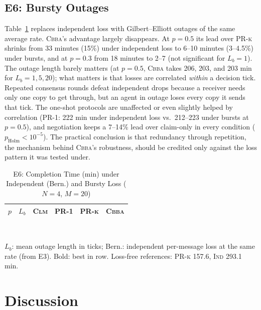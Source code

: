 \documentclass[conference]{IEEEtran}
\newcommand{\IND}{\textsc{Ind}}
\newcommand{\CLM}{\textsc{Clm}}
\newcommand{\PRone}{\textsc{PR-1}}
\newcommand{\PRk}{\textsc{PR-k}}
\newcommand{\CBBA}{\textsc{Cbba}}
\begin{document}
\subsection{E6: Bursty Outages}
Table~\ref{tab:bursty} replaces independent loss with Gilbert--Elliott outages of the same average rate. \CBBA{}'s advantage largely disappears. At $p=0.5$ its lead over \PRk{} shrinks from 33 minutes (15\%) under independent loss to 6--10 minutes (3--4.5\%) under bursts, and at $p=0.3$ from 18 minutes to 2--7 (not significant for $L_b=1$). The outage length barely matters (at $p=0.5$, \CBBA{} takes 206, 203, and 203 min for $L_b=1,5,20$); what matters is that losses are correlated \emph{within} a decision tick. Repeated consensus rounds defeat independent drops because a receiver needs only one copy to get through, but an agent in outage loses every copy it sends that tick. The one-shot protocols are unaffected or even slightly helped by correlation (\PRone{}: 222 min under independent loss vs.\ 212--223 under bursts at $p=0.5$), and negotiation keeps a 7--14\% lead over claim-only in every condition ($p_{\text{Holm}}<10^{-5}$). The practical conclusion is that redundancy through repetition, the mechanism behind \CBBA{}'s robustness, should be credited only against the loss pattern it was tested under.

\begin{table}[!t]
\caption{E6: Completion Time (min) under Independent (Bern.) and Bursty Loss ($N=4$, $M=20$)}
\label{tab:bursty}
\centering
\footnotesize
\setlength{\tabcolsep}{4pt}
\begin{tabular}{@{}llrrrr@{}}
\toprule
$p$ & $L_b$ & \CLM{} & \PRone{} & \PRk{} & \CBBA{} \\
\midrule

\end{tabular}\\[2pt]
\parbox{\columnwidth}{\scriptsize $L_b$: mean outage length in ticks; Bern.: independent per-message loss at the same rate (from E3). Bold: best in row. Loss-free references: \PRk{} 157.6, \IND{} 293.1 min.}
\end{table}

\section{Discussion}
\end{document}
